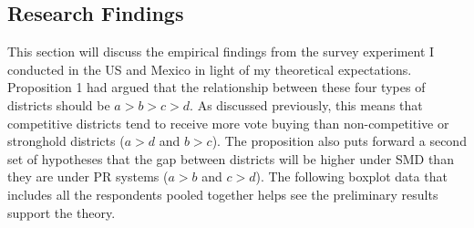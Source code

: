 \documentclass{article}
\begin{document}
\subsection{Research Findings}
This section will discuss the empirical findings from the survey experiment I conducted in the US and Mexico in light of my theoretical expectations. Proposition 1 had argued that the relationship between these four types of districts should be $a>b>c>d$. As discussed previously, this means that competitive districts tend to receive more vote buying than non-competitive or stronghold districts ($a>d$ and $b>c$). The proposition also puts forward a second set of hypotheses that the gap between districts will be higher under SMD than they are under PR systems ($a>b$ and $c>d$). The following boxplot data that includes all the respondents pooled together helps see the preliminary results  support the theory.\\
\\
\end{document}
